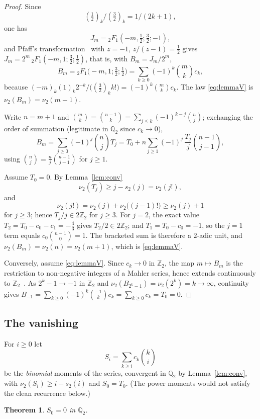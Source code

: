 \documentclass[10pt,a4paper]{amsart}
\newtheorem{theorem}{Theorem}[section]
\newcommand{\Zt}{\mathbb Z_2}
\newcommand{\Qt}{\mathbb Q_2}
\begin{document}
\begin{proof}
Since 
\[
(\tfrac12)_k/(\tfrac32)_k=1/(2k+1), 
\]
one has
\[
J_m={}_2F_1(-m,\tfrac12;\tfrac32;-1), 
\]
and Pfaff's transformation~\cite[Ch.~2]{AndrewsAskeyRoy} with $z=-1$, $z/(z-1)=\tfrac12$ gives $J_m=2^m\,{}_2F_1(-m,1;\tfrac32;\tfrac12)$, that is, with $B_m=J_m/2^m$,
\[
  B_m={}_2F_1\bigl(-m,1;\tfrac32;\tfrac12\bigr) =\sum_{k\ge0}(-1)^k\binom{m}{k}c_k ,
\]
because $(-m)_k(1)_k2^{-k}/\bigl((\tfrac32)_kk!\bigr)=(-1)^k\binom mkc_k$. The law \eqref{eq:lemmaV} is $\nu_2(B_m)=\nu_2(m+1)$.

Write $n=m+1$ and $\binom mk=\binom{n-1}k=\sum_{j\le k}(-1)^{k-j}\binom nj$; exchanging the order of summation (legitimate in $\Qt$ since $c_k\to0$),
\[
  B_m=\sum_{j\ge0}(-1)^j\binom njT_j =T_0+n\sum_{j\ge1}(-1)^j\,\frac{T_j}{j}\binom{n-1}{j-1},
\]
using $\binom nj=\frac nj\binom{n-1}{j-1}$ for $j\ge1$.

Assume $T_0=0$.  By Lemma~\ref{lem:conv}
\[
\nu_2(T_j)\ge j-s_2(j)=\nu_2(j!),
\]
and 
\[
\nu_2(j!)=\nu_2(j)+\nu_2\bigl((j-1)!\bigr)\ge\nu_2(j)+1
\] 
for $j\ge3$; hence $T_j/j\in2\Zt$ for $j\ge3$.  For $j=2$, the exact value $T_2=T_0-c_0-c_1=-\tfrac43$ gives $T_2/2\in2\Zt$; and $T_1=T_0-c_0=-1$, so the $j=1$ term equals $c_0\binom{n-1}0=1$.  The bracketed sum is therefore a $2$-adic unit, and $\nu_2(B_m)=\nu_2(n)=\nu_2(m+1)$, which is \eqref{eq:lemmaV}.

Conversely, assume \eqref{eq:lemmaV}.  Since $c_k\to0$ in $\Zt$, the map $m\mapsto B_m$ is the restriction to non-negative integers of a Mahler series, hence extends continuously to $\Zt$~\cite[Ch.~4]{Koblitz}.  As $2^k-1\to-1$ in $\Zt$ and $\nu_2(B_{2^k-1})=\nu_2(2^k)=k\to\infty$,
continuity gives $B_{-1}=\sum_{k\ge0}(-1)^k\binom{-1}kc_k=\sum_{k\ge0}c_k=T_0=0$.
\end{proof}

\subsection{The vanishing}

For $i\ge0$ let
\[
  S_i=\sum_{k\ge i}c_k\binom ki
\]
be the \emph{binomial} moments of the series, convergent in $\Qt$ by Lemma~\ref{lem:conv}, with $\nu_2(S_i)\ge i-s_2(i)$ and $S_0=T_0$.  (The power moments would not satisfy the clean recurrence below.)

\begin{theorem}\label{thm:vanish}
$S_0=0$ in $\Qt$.
\end{theorem}
\end{document}
